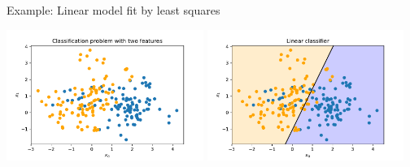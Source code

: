 \documentclass[notes]{beamer}          %
\newcommand{\vect}[1]{\bm{#1}}
\newcommand{\field}[1]{\mathbb{#1}}
\newcommand{\R}{\field{R}}
\newif\iffull
\begin{document}
\begin{frame}{Example: Linear model fit by least squares}
    \begin{center}
        \includegraphics[width=0.48\textwidth]{../figures/week_1/classification_problem.pdf}
        \hfill
        \includegraphics[width=0.48\textwidth]{../figures/week_1/linear_model.pdf}
        \end{center}
\end{frame}

\iffull
\begin{frame}
\frametitle{Example: Linear model fit by least squares}
\begin{itemize}
    \item Two classes separated in the plane ($\R^2$) by the decision boundary $\{ \vect{x} : \vect{w}^T\vect{x} = 0.5 \}$
    \item $\{ \vect{x} : \vect{w}^T\vect{x} < 0.5 \}$ set of \textcolor{blue}{BLUE} points
    \item $\{ \vect{x} : \vect{w}^T\vect{x} \geq 0.5 \}$ set of \textcolor{orange}{ORANGE} points

\end{itemize}
\end{frame}
\fi
\end{document}
